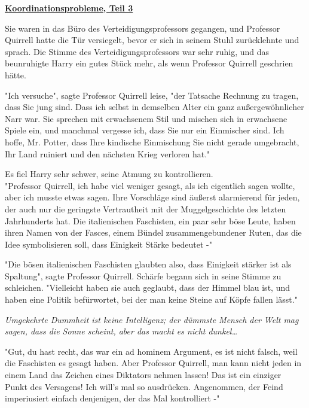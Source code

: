 

\hypertarget{koordinationsprobleme-teil-3}{%

\textbf{\uline{Koordinationsprobleme, Teil 3}}

Sie waren in das Büro des Verteidigungsprofessors gegangen, und Professor Quirrell hatte die Tür versiegelt, bevor er sich in seinem Stuhl zurücklehnte und sprach. Die Stimme des Verteidigungsprofessors war sehr ruhig, und das beunruhigte Harry ein gutes Stück mehr, als wenn Professor Quirrell geschrien hätte.

"Ich versuche", sagte Professor Quirrell leise, "der Tatsache Rechnung zu tragen, dass Sie jung sind. Dass ich selbst in demselben Alter ein ganz außergewöhnlicher Narr war. Sie sprechen mit erwachsenem Stil und mischen sich in erwachsene Spiele ein, und manchmal vergesse ich, dass Sie nur ein Einmischer sind. Ich hoffe, Mr. Potter, dass Ihre kindische Einmischung Sie nicht gerade umgebracht, Ihr Land ruiniert und den nächsten Krieg verloren hat."

Es fiel Harry sehr schwer, seine Atmung zu kontrollieren.\\ "Professor Quirrell, ich habe viel weniger gesagt, als ich eigentlich sagen wollte, aber ich musste etwas sagen. Ihre Vorschläge sind äußerst alarmierend für jeden, der auch nur die geringste Vertrautheit mit der Muggelgeschichte des letzten Jahrhunderts hat. Die italienischen Faschisten, ein paar sehr böse Leute, haben ihren Namen von der Fasces, einem Bündel zusammengebundener Ruten, das die Idee symbolisieren soll, dass Einigkeit Stärke bedeutet -"

"Die bösen italienischen Faschisten glaubten also, dass Einigkeit stärker ist als Spaltung", sagte Professor Quirrell. Schärfe begann sich in seine Stimme zu schleichen. "Vielleicht haben sie auch geglaubt, dass der Himmel blau ist, und haben eine Politik befürwortet, bei der man keine Steine auf Köpfe fallen lässt."

\emph{Umgekehrte Dummheit ist keine Intelligenz; der dümmste Mensch der Welt mag sagen, dass die Sonne scheint, aber das macht es nicht dunkel…}

"Gut, du hast recht, das war ein ad hominem Argument, es ist nicht falsch, weil die Faschisten es gesagt haben. Aber Professor Quirrell, man kann nicht jeden in einem Land das Zeichen eines Diktators nehmen lassen! Das ist ein einziger Punkt des Versagens! Ich will's mal so ausdrücken. Angenommen, der Feind imperiusiert einfach denjenigen, der das Mal kontrolliert -"

}
